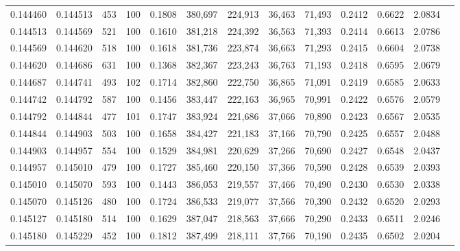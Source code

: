 \begin{tabular}{rrrrrrrrrrrrr}
0.144460 & 0.144513 &   453 & 100 &                                     0.1808 & 380,697 & 224,913 &  36,463 &  71,493 & 0.2412 & 0.6622 & 2.0834 \\
0.144513 & 0.144569 &   521 & 100 &                                     0.1610 & 381,218 & 224,392 &  36,563 &  71,393 & 0.2414 & 0.6613 & 2.0786 \\
0.144569 & 0.144620 &   518 & 100 &                                     0.1618 & 381,736 & 223,874 &  36,663 &  71,293 & 0.2415 & 0.6604 & 2.0738 \\
0.144620 & 0.144686 &   631 & 100 &                                     0.1368 & 382,367 & 223,243 &  36,763 &  71,193 & 0.2418 & 0.6595 & 2.0679 \\
0.144687 & 0.144741 &   493 & 102 &                                     0.1714 & 382,860 & 222,750 &  36,865 &  71,091 & 0.2419 & 0.6585 & 2.0633 \\
0.144742 & 0.144792 &   587 & 100 &                                     0.1456 & 383,447 & 222,163 &  36,965 &  70,991 & 0.2422 & 0.6576 & 2.0579 \\
0.144792 & 0.144844 &   477 & 101 &                                     0.1747 & 383,924 & 221,686 &  37,066 &  70,890 & 0.2423 & 0.6567 & 2.0535 \\
0.144844 & 0.144903 &   503 & 100 &                                     0.1658 & 384,427 & 221,183 &  37,166 &  70,790 & 0.2425 & 0.6557 & 2.0488 \\
0.144903 & 0.144957 &   554 & 100 &                                     0.1529 & 384,981 & 220,629 &  37,266 &  70,690 & 0.2427 & 0.6548 & 2.0437 \\
0.144957 & 0.145010 &   479 & 100 &                                     0.1727 & 385,460 & 220,150 &  37,366 &  70,590 & 0.2428 & 0.6539 & 2.0393 \\
0.145010 & 0.145070 &   593 & 100 &                                     0.1443 & 386,053 & 219,557 &  37,466 &  70,490 & 0.2430 & 0.6530 & 2.0338 \\
0.145070 & 0.145126 &   480 & 100 &                                     0.1724 & 386,533 & 219,077 &  37,566 &  70,390 & 0.2432 & 0.6520 & 2.0293 \\
0.145127 & 0.145180 &   514 & 100 &                                     0.1629 & 387,047 & 218,563 &  37,666 &  70,290 & 0.2433 & 0.6511 & 2.0246 \\
0.145180 & 0.145229 &   452 & 100 &                                     0.1812 & 387,499 & 218,111 &  37,766 &  70,190 & 0.2435 & 0.6502 & 2.0204 \\

\end{tabular}
